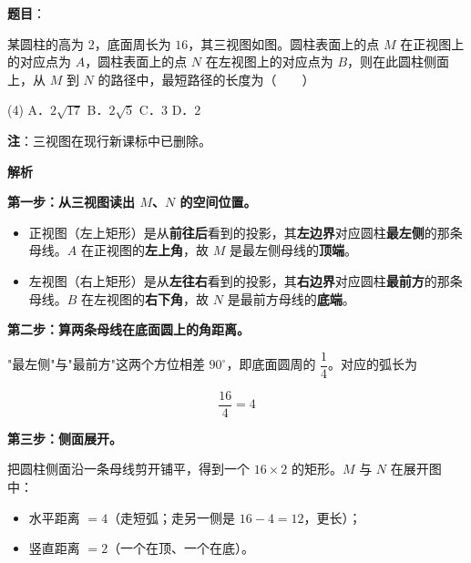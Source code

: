 \begin{answer}

\textbf{题目}：

某圆柱的高为 $2$，底面周长为 $16$，其三视图如图。圆柱表面上的点 $M$ 在正视图上的对应点为 $A$，圆柱表面上的点 $N$ 在左视图上的对应点为 $B$，则在此圆柱侧面上，从 $M$ 到 $N$ 的路径中，最短路径的长度为\mbox{（　　）}
\nopagebreak[4]
\begin{center}\end{center}
\nopagebreak[4]
\begin{gkopts}(4)
\task A．$2\sqrt{17}$
\task B．$2\sqrt5$
\task C．$3$
\task D．$2$
\end{gkopts}

\begin{gktip}
\textbf{注}：三视图在现行新课标中已删除。
\end{gktip}

\textbf{解析}

\textbf{第一步：从三视图读出 $M$、$N$ 的空间位置。}

\begin{itemize}
\item 正视图（左上矩形）是从\textbf{前往后}看到的投影，其\textbf{左边界}对应圆柱\textbf{最左侧}的那条母线。$A$ 在正视图的\textbf{左上角}，故 $M$ 是最左侧母线的\textbf{顶端}。
\item 左视图（右上矩形）是从\textbf{左往右}看到的投影，其\textbf{右边界}对应圆柱\textbf{最前方}的那条母线。$B$ 在左视图的\textbf{右下角}，故 $N$ 是最前方母线的\textbf{底端}。
\end{itemize}

\Needspace{0.25\textheight}

\textbf{第二步：算两条母线在底面圆上的角距离。}

"最左侧"与"最前方"这两个方位相差 $90^\circ$，即底面圆周的 $\dfrac14$。对应的弧长为

\nopagebreak[4]
\[\frac{16}4=4\]

\textbf{第三步：侧面展开。}

把圆柱侧面沿一条母线剪开铺平，得到一个 $16\times2$ 的矩形。$M$ 与 $N$ 在展开图中：

\begin{itemize}
\item 水平距离 $=4$（走短弧；走另一侧是 $16-4=12$，更长）；
\item 竖直距离 $=2$（一个在顶、一个在底）。
\end{itemize}


\end{answer}
